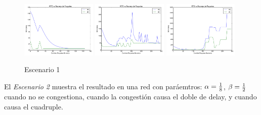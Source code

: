         \begin{figure}[H]
            \center
	        
		    \includegraphics[width=0.32\textwidth]{imagenes/guille/rtt_vs_n_2_4.pdf}
		    \includegraphics[width=0.32\textwidth]{imagenes/guille/congestion_50_2_4.pdf}
		    \includegraphics[width=0.32\textwidth]{imagenes/guille/congestion_100_2_4.pdf}

            \caption{Escenario 1}
	
        \end{figure}          
  
        El \emph{Escenario 2} muestra el resultado en una red con
        par\'aemtros: $\alpha={{1}\over{8}}$, $\beta={{1}\over{2}}$ 
        cuando no se congestiona, cuando la congesti\'on causa el doble de
        delay, y cuando causa el cuadruple.

